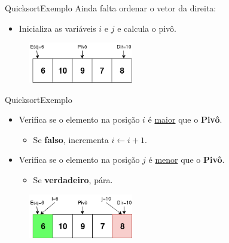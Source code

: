 \documentclass[aspectratio=169]{beamer}
\begin{document}

\begin{frame}{Quicksort}{Exemplo}
Ainda falta ordenar o vetor da direita:
\begin{itemize}
 \item Inicializa as variáveis $i$ e $j$ e calcula o pivô.
\end{itemize}


\begin{figure}[!h]
  \centering
  \includegraphics[width=130pt]{imgs/quick/quick29.png}
  \label{fig_quick29}
\end{figure}

\end{frame}


\begin{frame}{Quicksort}{Exemplo}
\begin{itemize}
 \item Verifica se o elemento na posição $i$ é \underline{maior} que o {\bf Pivô}.
  \begin{itemize}
 \item Se {\bf falso}, incrementa $i\leftarrow i + 1$.
 \end{itemize}
 \item Verifica se o elemento na posição $j$ é \underline{menor} que o {\bf Pivô}.
 \begin{itemize}
  \item Se {\bf verdadeiro}, pára.
 \end{itemize}
\end{itemize}

\begin{figure}[!h]
  \centering
  \includegraphics[width=130pt]{imgs/quick/quick30.png}
  \label{fig_quick30}
\end{figure}

\end{frame}

\end{document}
